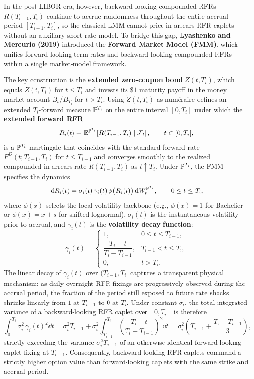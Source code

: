 In the post-LIBOR era, however, backward-looking compounded RFRs $R(T_{i-1}, T_i)$ continue to accrue randomness throughout the entire accrual period $[T_{i-1}, T_i]$, so the classical LMM cannot price in-arrears RFR caplets without an auxiliary short-rate model. To bridge this gap, \textbf{Lyashenko and Mercurio (2019)} introduced the \textbf{Forward Market Model (FMM)}, which unifies forward-looking term rates and backward-looking compounded RFRs within a single market-model framework.

The key construction is the \textbf{extended zero-coupon bond} $\widetilde{Z}(t, T_i)$, which equals $Z(t, T_i)$ for $t \leq T_i$ and invests its $\$1$ maturity payoff in the money market account $B_t / B_{T_i}$ for $t > T_i$. Using $\widetilde{Z}(t, T_i)$ as num\'eraire defines an extended $T_i$-forward measure $\mathbb{P}^{T_i}$ on the entire interval $[0, T_i]$ under which the \textbf{extended forward RFR}
\[
R_i(t) = \mathbb{E}^{\mathbb{P}^{T_i}}\!\left[R(T_{i-1}, T_i) \;\middle|\; \mathcal{F}_t\right], \qquad t \in [0, T_i],
\]
is a $\mathbb{P}^{T_i}$-martingale that coincides with the standard forward rate $F^D(t; T_{i-1}, T_i)$ for $t \leq T_{i-1}$ and converges smoothly to the realized compounded-in-arrears rate $R(T_{i-1}, T_i)$ as $t \uparrow T_i$. Under $\mathbb{P}^{T_i}$, the FMM specifies the dynamics
\begin{equation}\label{eq:fmm-sde}
\,\mathrm{d} R_i(t) = \sigma_i(t)\,\gamma_i(t)\,\phi\bigl(R_i(t)\bigr)\,\mathrm{d} W_t^{\mathbb{P}^{T_i}}, \qquad 0 \leq t \leq T_i,
\end{equation}
where $\phi(x)$ selects the local volatility backbone (e.g., $\phi(x) = 1$ for Bachelier or $\phi(x) = x + s$ for shifted lognormal), $\sigma_i(t)$ is the instantaneous volatility prior to accrual, and $\gamma_i(t)$ is the \textbf{volatility decay function}:
\[
\gamma_i(t) = \begin{cases}
1, & 0 \leq t \leq T_{i-1}, \\
\dfrac{T_i - t}{T_i - T_{i-1}}, & T_{i-1} < t \leq T_i, \\
0, & t > T_i.
\end{cases}
\]
The linear decay of $\gamma_i(t)$ over $(T_{i-1}, T_i]$ captures a transparent physical mechanism: as daily overnight RFR fixings are progressively observed during the accrual period, the fraction of the period still exposed to future rate shocks shrinks linearly from $1$ at $T_{i-1}$ to $0$ at $T_i$. Under constant $\sigma_i$, the total integrated variance of a backward-looking RFR caplet over $[0, T_i]$ is therefore
\[
\int_0^{T_i} \sigma_i^2\,\gamma_i(t)^2\dd t = \sigma_i^2 T_{i-1} + \sigma_i^2 \int_{T_{i-1}}^{T_i} \left(\frac{T_i - t}{T_i - T_{i-1}}\right)^2 \dd t = \sigma_i^2\left(T_{i-1} + \frac{T_i - T_{i-1}}{3}\right),
\]
strictly exceeding the variance $\sigma_i^2 T_{i-1}$ of an otherwise identical forward-looking caplet fixing at $T_{i-1}$. Consequently, backward-looking RFR caplets command a strictly higher option value than forward-looking caplets with the same strike and accrual period.

